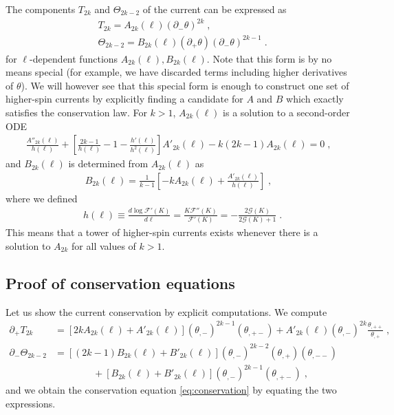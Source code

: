 \documentclass[12pt]{article}
\begin{document}
The components $T_{2k}$ and $\Theta_{2k-2}$ of the current can be expressed as
\begin{align}
&T_{2k}= A_{2k}(\ell) (\partial_{-} \theta)^{2k} \;,\\
&\Theta_{2k-2}= B_{2k}(\ell) (\partial_{+} \theta) (\partial_{-} \theta)^{2k-1} \;.
\end{align}
for $\ell$-dependent functions 
$A_{2k}(\ell), B_{2k}(\ell)$.
Note that this form is by no means special (for example, we have discarded terms including higher derivatives of $\theta$). We will however see that this special form is enough to construct one set of higher-spin currents by explicitly finding a candidate for $A$ and $B$ which exactly satisfies the conservation law.
For $k>1$, $A_{2k}(\ell)$ is a solution to a second-order ODE
\begin{align}\label{eq:ODE_A}
\frac{A''_{2k}(\ell)}{h(\ell)}
+ \left[\frac{2k-1}{h(\ell)} -1 -\frac{h'(\ell)}{h^2(\ell)} \right]
A'_{2k}(\ell) - k(2k-1) A_{2k}(\ell) =0 \;,
\end{align}
and $B_{2k}(\ell)$ is determined from $A_{2k}(\ell)$ as 
\begin{align}
B_{2k}(\ell) = \frac{1}{k-1} \left[-k A_{2k}(\ell) + \frac{A'_{2k}(\ell)}{h(\ell)} \right] \;,
\end{align}
where we defined
\begin{align}
&h(\ell) \equiv \frac{d \log \mathcal{F}'(K)}{d\ell} 
= \frac{K\mathcal{F}''(K)}{\mathcal{F}'(K)}
=-\frac{2\mathcal{G}(K)}{2\mathcal{G}(K)+1} \;.
\end{align}
This means that a tower of higher-spin currents exists whenever there is a solution to $A_{2k}$ for all values of $k>1$.

\subsection{Proof of conservation equations}

Let us show the current conservation by explicit computations.
We compute
\begin{align}
\partial_{+} T_{2k} &= [2k A_{2k}(\ell) + A'_{2k}(\ell) ] (\theta_{,-})^{2k-1} (\theta_{,+-})  + A'_{2k}(\ell) (\theta_{,-})^{2k} \frac{\theta_{,++}}{\theta_{,+}} \;,\\
%
\partial_{-} \Theta_{2k-2} &= [(2k-1) B_{2k}(\ell) + B'_{2k}(\ell) ] (\theta_{,-})^{2k-2} (\theta_{,+})  (\theta_{,--}) \nonumber\\
& \qquad \qquad +[B_{2k}(\ell) +  B'_{2k}(\ell)] (\theta_{,-})^{2k-1} (\theta_{,+-})\;,
\end{align}
and we obtain the conservation equation \eqref{eq:conservation} by equating the two expressions.
\end{document}
